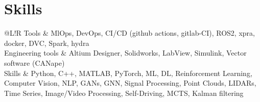 \documentclass[12pt, a4paper]{extarticle}
\newcommand*{\sectionformat}{\centering}
\newcommand\VRule{\color{lightgray}\vrule width 0.5pt}
\begin{document}
\section*{\sectionformat Skills}
\begin{tabular}{@{}L!{\VRule}R}
	Tools             & MlOps, DevOps, CI/CD (github actions, gitlab-CI), ROS2, xpra, docker, DVC, Spark, hydra                                                                                                                            \\
	Engineering tools & Altium Designer, Solidworks, LabView, Simulink, Vector software (CANape)                                                                                                                                           \\
	Skills            & Python, C++, MATLAB, PyTorch, ML, DL, Reinforcement Learning, Computer Vision, NLP, GANs, GNN, Signal Processing, Point Clouds, LIDARs, Time Series, Image/Video Processing,  Self-Driving, MCTS, Kalman filtering
	\\
\end{tabular}
\end{document}
